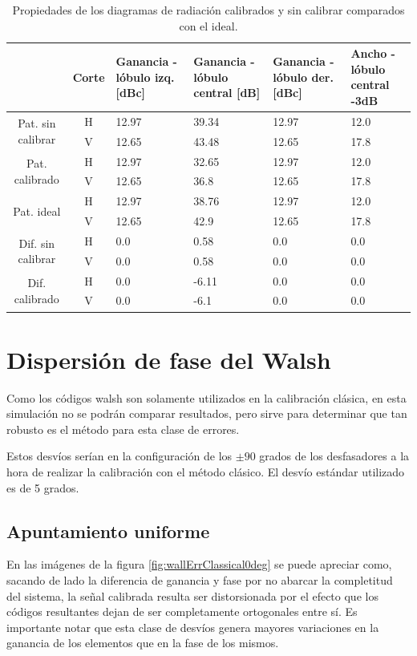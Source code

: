 \begin{table}[H]
  \footnotesize
  \centering
  \begin{tabular}{|c|c|p{2cm}|p{2.5cm}|p{2.5cm}|p{2.5cm}|}
    \cline{2-6}
    \multicolumn{1}{c|}{} & Corte & Ganancia - lóbulo izq. [dBc] & Ganancia - lóbulo central [dB] &
    Ganancia - lóbulo der. [dBc] & Ancho - lóbulo central -3dB \tabularnewline\hline
    \multirow{2}{2cm}{Pat. sin calibrar} & H & 12.97 & 39.34 & 12.97 & 12.0 \tabularnewline\cline{2-6}
     & V & 12.65 & 43.48 & 12.65 & 17.8 \tabularnewline\hline
    \multirow{2}{2cm}{Pat. calibrado} & H & 12.97 & 32.65 & 12.97 & 12.0 \tabularnewline\cline{2-6}
     & V & 12.65 & 36.8 & 12.65 & 17.8 \tabularnewline\hline
    \multirow{2}{2cm}{Pat. ideal} & H & 12.97 & 38.76 & 12.97 & 12.0 \tabularnewline\cline{2-6}
     & V & 12.65 & 42.9 & 12.65 & 17.8 \tabularnewline\hline
    \multirow{2}{2cm}{Dif. sin calibrar} & H & 0.0 & 0.58 & 0.0 & 0.0\tabularnewline\cline{2-6}
     & V & 0.0 & 0.58 & 0.0 & 0.0 \tabularnewline\hline
    \multirow{2}{2cm}{Dif. calibrado} & H & 0.0 & -6.11 & 0.0 & 0.0 \tabularnewline\cline{2-6}
     & V & 0.0 & -6.1 & 0.0 & 0.0 \tabularnewline\hline
  \end{tabular}
  \caption{Propiedades de los diagramas de radiación calibrados y sin calibrar comparados con el ideal.}
  \label{tab:chirpRepErrClassical10degRow}
\end{table}


\section{Dispersión de fase del Walsh}

Como los códigos walsh son solamente utilizados en la calibración clásica, en esta simulación no se podrán comparar 
resultados, pero sirve para determinar que tan robusto es el método para esta clase de errores. 

Estos desvíos serían en la configuración de los $\pm 90$ grados de los desfasadores a la hora de realizar la calibración con 
el método clásico. El desvío estándar utilizado es de 5 grados. 

\subsection{Apuntamiento uniforme}

En las imágenes de la figura \ref{fig:wallErrClassical0deg} se puede apreciar como, sacando de lado la diferencia de ganancia 
y fase por no abarcar la completitud del sistema, la señal calibrada resulta ser distorsionada por el efecto que los códigos 
resultantes dejan de ser completamente ortogonales entre sí. Es importante notar que esta clase de desvíos genera mayores 
variaciones en la ganancia de los elementos que en la fase de los mismos.

